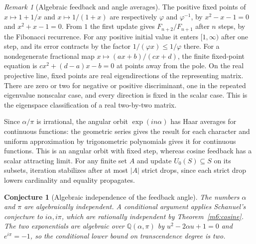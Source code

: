 \documentclass[11pt,reqno]{amsart}
\newtheorem{conjecture}[theorem]{Conjecture}
\theoremstyle{definition}
\theoremstyle{remark}
\newtheorem{remark}[theorem]{Remark}
\numberwithin{equation}{section}
\newcommand{\Q}{\mathbb{Q}}
\begin{document}
\begin{remark}[Algebraic feedback and angle averages]\label{m6:golden}
The positive fixed points of \(x\mapsto1+1/x\) and
\(x\mapsto1/(1+x)\) are respectively \(\varphi\) and
\(\varphi^{-1}\), by \(x^2-x-1=0\) and \(x^2+x-1=0\).
From \(1\) the first update gives \(F_{n+2}/F_{n+1}\) after \(n\)
steps, by the Fibonacci recurrence. For any positive initial
value it enters \([1,\infty)\) after one step, and its error
contracts by the factor \(1/(\varphi x)\le1/\varphi\) there.
For a nondegenerate fractional map \(x\mapsto(ax+b)/(cx+d)\),
the finite fixed-point equation is \(cx^2+(d-a)x-b=0\) at
points away from the pole. On the real projective line, fixed
points are real eigendirections of the representing matrix.
There are zero or two for negative or positive discriminant,
one in the repeated eigenvalue nonscalar case, and every direction
is fixed in the scalar case. This is the eigenspace classification
of a real two-by-two matrix.

Since \(\alpha/\pi\) is irrational, the angular orbit
\(\exp(in\alpha)\) has Haar averages for continuous functions:
the geometric series gives the result for each character and
uniform approximation by trigonometric polynomials gives it
for continuous functions. This is an angular orbit with fixed
step, whereas cosine feedback has a scalar attracting limit.
For any finite set \(A\) and update \(U_0(S)\subseteq S\) on its
subsets, iteration stabilizes after at most \(|A|\) strict drops,
since each strict drop lowers cardinality and equality propagates.
\end{remark}

\begin{conjecture}[Algebraic independence of the feedback angle]\label{m6:dottie-conj}
The numbers \(\alpha\) and \(\pi\) are algebraically independent.
A conditional argument applies Schanuel's conjecture to
\(i\alpha,i\pi\), which are rationally independent by
Theorem~\ref{m6:cosine}. The two exponentials are algebraic over
\(\Q(\alpha,\pi)\) by \(u^2-2\alpha u+1=0\) and \(e^{i\pi}=-1\),
so the conditional lower bound on transcendence degree is two.
\end{conjecture}
\end{document}
